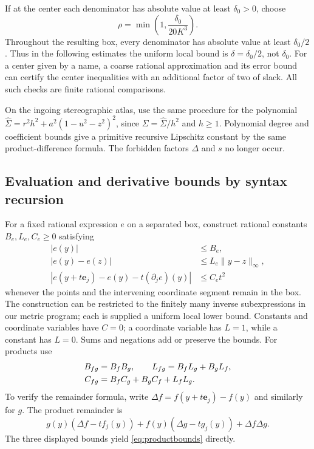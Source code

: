 \documentclass[11pt,a4paper]{article}
\numberwithin{equation}{section}
\theoremstyle{definition}\newtheorem{definition}[theorem]{Definition}
\theoremstyle{remark}\newtheorem{remark}[theorem]{Remark}
\begin{document}
If at the center each denominator has absolute value at least $\delta_0>0$, choose
\begin{equation}\label{eq:radius}
 \rho=\min\left(1,\frac{\delta_0}{20K^3}\right).
\end{equation}
Throughout the resulting box, every denominator has absolute value at least $\delta_0/2$. Thus in the following estimates the uniform local bound is $\delta=\delta_0/2$, not $\delta_0$. For a center given by a name, a coarse rational approximation and its error bound can certify the center inequalities with an additional factor of two of slack. All such checks are finite rational comparisons.

On the ingoing stereographic atlas, use the same procedure for the polynomial $\widehat\Sigma=r^2h^2+a^2(1-u^2-z^2)^2$, since $\Sigma=\widehat\Sigma/h^2$ and $h\ge1$. Polynomial degree and coefficient bounds give a primitive recursive Lipschitz constant by the same product-difference formula. The forbidden factors $\Delta$ and $s$ no longer occur.

\subsection{Evaluation and derivative bounds by syntax recursion}
For a fixed rational expression $e$ on a separated box, construct rational constants $B_e,L_e,C_e\ge0$ satisfying
\begin{align}
 |e(y)|&\le B_e,\label{eq:Bbound}\\
 |e(y)-e(z)|&\le L_e\|y-z\|_\infty,\label{eq:Lbound}\\
 |e(y+t\mathbf e_j)-e(y)-t(\partial_je)(y)|&\le C_e t^2\label{eq:Cbound}
\end{align}
whenever the points and the intervening coordinate segment remain in the box. The construction can be restricted to the finitely many inverse subexpressions in our metric program; each is supplied a uniform local lower bound. Constants and coordinate variables have $C=0$; a coordinate variable has $L=1$, while a constant has $L=0$. Sums and negations add or preserve the bounds. For products use
\begin{align}
 B_{fg}&=B_fB_g,\qquad L_{fg}=B_fL_g+B_gL_f,\notag\\
 C_{fg}&=B_fC_g+B_gC_f+L_fL_g.\label{eq:productbounds}
\end{align}
To verify the remainder formula, write $\Delta f=f(y+t\mathbf e_j)-f(y)$ and similarly for $g$. The product remainder is
\[
 g(y)(\Delta f-tf_j(y))+f(y)(\Delta g-tg_j(y))+\Delta f\Delta g.
\]
The three displayed bounds yield \eqref{eq:productbounds} directly.
\end{document}
